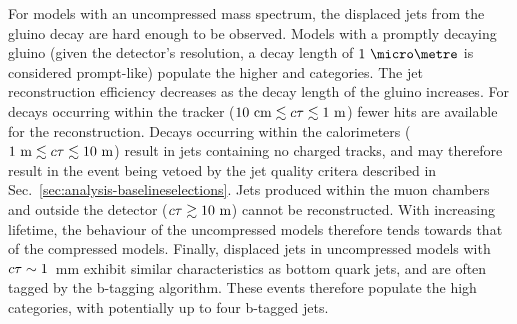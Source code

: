 For models with an uncompressed mass spectrum, the displaced jets from the 
gluino decay are hard enough to be observed. Models with a promptly decaying 
gluino (given the detector's resolution, a decay length of $1~\micro\metre$ is 
considered 
prompt-like) populate the higher \njet and \scalht categories. The jet 
reconstruction efficiency decreases as the decay length of the gluino 
increases. For decays occurring within the tracker ($10~\mathrm{cm} \lesssim 
c\tau \lesssim 1~\mathrm{m}$) 
fewer hits are available for the reconstruction. 
Decays occurring within the calorimeters ($1~\mathrm{m} \lesssim c\tau \lesssim 
10~\mathrm{m}$) 
result in jets containing no charged tracks, and may therefore 
result in the event being vetoed by the jet quality critera described in 
Sec.~\ref{sec:analysis-baselineselections}. Jets produced within the muon 
chambers and outside the detector ($c\tau \gtrsim 10~\mathrm{m}$) cannot be 
reconstructed. With increasing lifetime, the behaviour of the uncompressed 
models therefore tends towards that of the compressed models. Finally, 
displaced jets in uncompressed models with $c\tau \sim 1$~mm exhibit similar 
characteristics as bottom quark jets, and are often tagged by the b-tagging 
algorithm. These events therefore populate the high \nb categories, with 
potentially up to four b-tagged jets.





